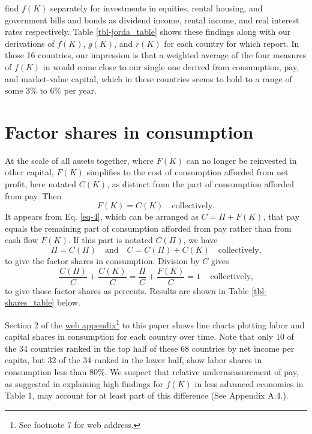 \documentclass[a4paper,fleqn]{cas-sc}
\begin{document}
\citeauthor{jorda2019} find \(f(K)\) separately for investments in equities, rental housing, and government bills and bonds as dividend income, rental income, and real interest rates respectively. Table \ref{tbl-jorda_table} shows these findings along with our derivations of \(f(K)\), \(g(K)\), and \(r(K)\) for each country for which \citeauthor{jorda2019} report. In those 16 countries, our impression is that a weighted average of the four measures of \(f(K)\) in \citeauthor{jorda2019} would come close to our single one derived from consumption, pay, and market-value capital, which in these countries seems to hold to a range of some 3\% to 6\% per year.




\section{Factor shares in consumption}

At the scale of all assets together, where $F(K)$ can no longer be reinvested in other capital, $F(K)$ simplifies to the cost of consumption afforded from net profit, here notated $C(K)$, as distinct from the part of consumption afforded from pay. Then 
%
\begin{equation}
F(K) = C(K) \quad \text{collectively.} \label{eq-7}
\end{equation}
%
It appears from Eq. \eqref{eq-4}, which can be arranged as $C = \Pi + F(K)$, that pay equals the remaining part of consumption afforded from pay rather than from cash flow $F(K)$. If this part is notated $C(\Pi)$, we have
\begin{equation}
\Pi = C(\Pi) \quad \text{and} \quad C = C(\Pi) + C(K) \quad \text{collectively,} \label{eq-8}
\end{equation}
to give the factor shares in consumption. Division by \(C\) gives
\begin{equation}
\frac{C(\Pi)}{C} + \frac{C(K)}{C} = \frac{\Pi}{C} + \frac{F(K)}{C} = 1 \, \quad \text{collectively,} \label{eq-9}
\end{equation}
to give those factor shares as percents. Results are shown in Table \ref{tbl-shares_table} below.

\FloatBarrier

\FloatBarrier

Section 2 of the \href{https://web-appendix.quarto.pub/separate-way-to-measure-rate-of-return/}{web appendix}\footnote{See footnote 7 for web address.} to this paper shows line charts plotting labor and capital shares in consumption for each country over time. Note that only 10 of the 34 countries ranked in the top half of these 68 countries by net income per capita, but 32 of the 34 ranked in the lower half, show labor shares in consumption less than 80\%. We suspect that relative undermeasurement of pay, as suggested in explaining high findings for \(f(K)\) in less advanced economies in Table 1, may account for at least part of this difference (See Appendix A.4.).
\end{document}
